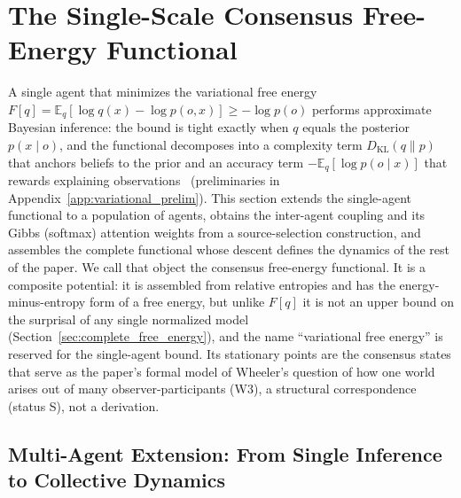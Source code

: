 \section{The Single-Scale Consensus Free-Energy Functional}\label{sec:free_energy}

A single agent that minimizes the variational free energy $F[q] = \mathbb{E}_{q}[\log q(x) - \log p(o, x)] \geq -\log p(o)$ performs approximate Bayesian inference: the bound is tight exactly when $q$ equals the posterior $p(x \mid o)$, and the functional decomposes into a complexity term $D_{\mathrm{KL}}(q \| p)$ that anchors beliefs to the prior and an accuracy term $-\mathbb{E}_{q}[\log p(o \mid x)]$ that rewards explaining observations~\cite{Friston2010, parr2022active} (preliminaries in Appendix~\ref{app:variational_prelim}). This section extends the single-agent functional to a population of agents, obtains the inter-agent coupling and its Gibbs (softmax) attention weights from a source-selection construction, and assembles the complete functional whose descent defines the dynamics of the rest of the paper. We call that object the consensus free-energy functional. It is a composite potential: it is assembled from relative entropies and has the energy-minus-entropy form of a free energy, but unlike $F[q]$ it is not an upper bound on the surprisal of any single normalized model (Section~\ref{sec:complete_free_energy}), and the name ``variational free energy'' is reserved for the single-agent bound. Its stationary points are the consensus states that serve as the paper's formal model of Wheeler's question of how one world arises out of many observer-participants (W3), a structural correspondence (status S), not a derivation.

\subsection{Multi-Agent Extension: From Single Inference to Collective Dynamics}

